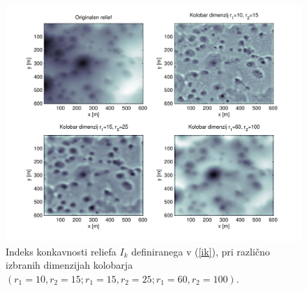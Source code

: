 \documentclass[a4paper, twoside, 12pt]{book}
\begin{document}
  \begin{figure}[h!]
    \begin{center}
      \includegraphics[width=12cm]{slike/concavity-samples}
    \end{center}
    \caption{Indeks konkavnosti reliefa $I_k$ definiranega v (\ref{ik}), pri različno izbranih dimenzijah kolobarja $(r_1=10,r_2=15;r_1=15,r_2=25;r_1=60,r_2=100)$.}
    \label{fig:concavity-samples}
  \end{figure}
\end{document}
